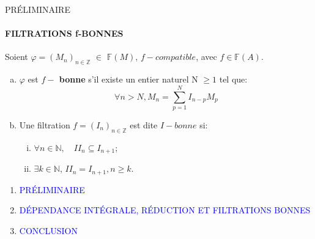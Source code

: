 \documentclass[11pt,a4paper]{beamer}
\begin{document}
	\begin{frame}{PRÉLIMINAIRE}
		\framesubtitle{FILTRATIONS f-BONNES}
		\begin{block}{}
			Soient $\varphi=(M_n)_{n \in \mathbb{Z}}$ $\in$ $\mathbb{F}(M)$, $f-compatible$, avec $f \in \mathbb{F}(A)$.
			\begin{enumerate}[(a)]
				\item $\varphi$ est \textbf{$f-$ bonne} s'il existe un entier naturel N $\geqslant 1$ tel que:
				\[\forall n > N, M_{n}=\sum_{p=1}^{N}I_{n-p}M_{p} \]
				\item Une filtration $f=(I_n)_{n \in \mathbb{Z}}$ est dite $I-bonne$ si: 
				\begin{enumerate}[(i)]
					\item $\forall n \in \mathbb{N}, \quad II_n \subseteq I_{n+1}$;
					\item $\exists k \in \mathbb{N}$, $II_n = I_{n+1}, n\geqslant k$.
				\end{enumerate}
			\end{enumerate}
		\end{block}
	\end{frame}
	
	
	
	\begin{frame}
		\begin{enumerate}
			\item<0> \textcolor{blue}{PRÉLIMINAIRE}\\
			\item<1> \textcolor{blue}{DÉPENDANCE INTÉGRALE, RÉDUCTION ET FILTRATIONS BONNES }\\
			\item<0> \textcolor{blue}{CONCLUSION}\\
		\end{enumerate}
	\end{frame}
	
\end{document}
